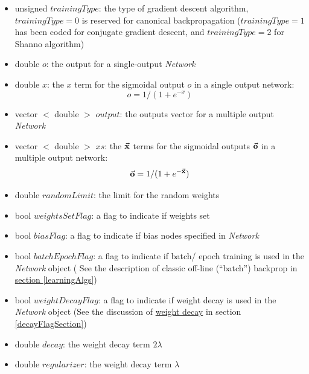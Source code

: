 \documentclass{report}
\def\beginred{\color{red}}
\def\endcolor{\color{black}}
\begin{document}
\begin{itemize}
\begin{itemize}
\item \beginred unsigned $trainingType$: the type of gradient descent
      algorithm, $trainingType = 0$ is reserved for canonical
      backpropagation ($trainingType = 1$ has been coded for conjugate
      gradient descent, and $trainingType = 2$ for Shanno algorithm)
      \endcolor
\item \beginred double $o$: the output for a single-output {\em
      Network} \endcolor
\item \beginred double $x$: the $x$ term for the sigmoidal output $o$
      in a single output network:\endcolor
\begin{displaymath}
o = 1/(1+e^{-x})
\end{displaymath}
\item \beginred vector $<$ double $>$ $output$: the outputs vector for
      a multiple output {\em Network} \endcolor
\item \beginred vector $<$ double $>$ $xs$: the $\vec{\bf x}$ terms
      for the sigmoidal outputs $\vec{\bf o}$ in a multiple output
      network: \endcolor{}
\begin{displaymath}
\vec{\bf o} = 1/(1+e^{-\vec{\bf x}})
\end{displaymath}
\item \beginred double $randomLimit$: the limit for the random weights
      \endcolor
\item \beginred bool $weightsSetFlag$: a flag to indicate if weights
      set \endcolor
\item \beginred bool $biasFlag$: a flag to indicate if bias nodes
      specified in {\em Network} \endcolor
\item \beginred bool $batchEpochFlag$: a flag to indicate if batch/
      epoch training is used in the {\em Network} object \endcolor (
      See the description of classic off-line (``batch'') backprop in
      \hyperref[learningAlgs]{section \ref{learningAlgs}})
\item \beginred bool $weightDecayFlag$: a flag to indicate if weight
      decay is used in the {\em Network} object \endcolor (See the
      discussion of \hyperref[discussDecay]{weight decay} in section
      \ref{decayFlagSection})
\item \beginred double $decay$: the weight decay term $2\lambda$
\endcolor
\item \beginred double $regularizer$: the weight decay term $\lambda$

\end{itemize}
\end{itemize}
\end{document}
